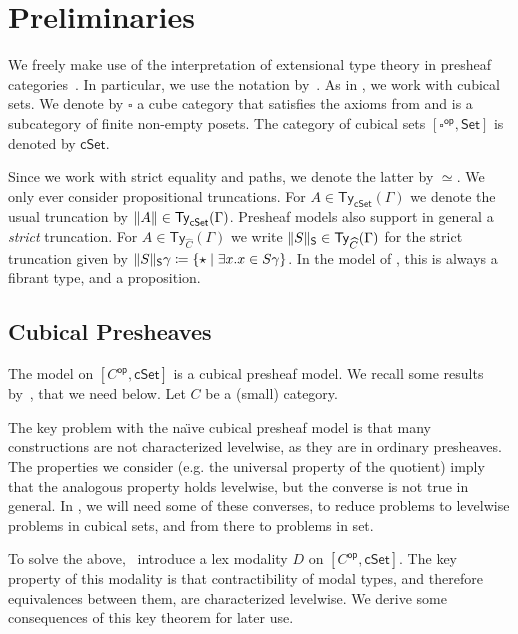 \documentclass[10pt,a4paper]{article}
\newcommand{\Set}{\mathsf{Set}}
\newcommand{\cSet}{\mathsf{cSet}}
\DeclareMathOperator\op{\mathsf{op}}
\newcommand\Ty{\mathsf{Ty}}
\DeclarePairedDelimiter\set{\{}{\}}
\begin{document}
\section{Preliminaries}\label{sec:preliminaries}

We freely make use of the interpretation of extensional type theory in presheaf categories~\cite{hofmann,huber-phd-thesis}.
In particular, we use the notation by~\cite{huber-phd-thesis}.
As in \cite{draft}, we work with cubical sets.
We denote by \(\square\) a cube category that satisfies the axioms from \cite{survey} and is a subcategory of finite non-empty posets.
The category of cubical sets \([\square^{\op}, \Set]\) is denoted by \(\cSet\).

Since we work with strict equality and paths, we denote the latter by \(\simeq\).
We only ever consider propositional truncations.
For \(A \in \Ty_{\cSet}(\Gamma)\) we denote the usual truncation by \(\trunc{A} \in \Ty_{\cSet}(\Gamma)\).
Presheaf models also support in general a \emph{strict} truncation.
For \(A \in \Ty_{\widehat{C}}(\Gamma)\) we write \(\trunc*{S} \in \Ty_{\widehat{C}}(\Gamma)\) for the strict truncation given by \(\trunc*{S}\gamma \coloneqq \set{ \star \mid \exists x. x \in S\gamma }\).
In the model of \HoTT{}, this is always a fibrant type, and a proposition.


\subsection{Cubical Presheaves}

The model on \([C^{\op}, \cSet]\) is a cubical presheaf model.
We recall some results by~\cite{CRS21}, that we need below.
Let \(C\) be a (small) category.

The key problem with the na{\"\i}ve cubical presheaf model is that many constructions are not characterized levelwise, as they are in ordinary presheaves.
The properties we consider (e.g. the universal property of the quotient) imply that the analogous property holds levelwise, but the converse is not true in general.
In , we will need some of these converses, to reduce problems to levelwise problems in cubical sets, and from there to problems in set.

To solve the above,~\cite{CRS21} introduce a lex modality \(D\) on \([C^{\op}, \cSet]\).
The key property of this modality is that contractibility of modal types, and therefore equivalences between them, are characterized levelwise.
We derive some consequences of this key theorem for later use.
\end{document}
